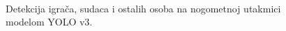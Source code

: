 \begin{figure}[h]
\begin{center}
 \\
\caption{Detekcija igrača, sudaca i ostalih osoba na nogometnoj utakmici modelom YOLO v3.}
\label{nogomet_yolo}
\end{center}
\end{figure}